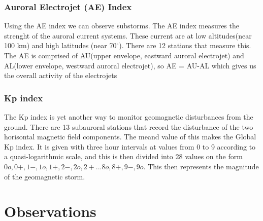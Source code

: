 \documentclass[norsk,a4paper,12pt]{article}
\begin{document}
\begin{multicols}{2}
\subsubsection{Auroral Electrojet (AE) Index} %
\label{sub:AE_index}
Using the AE index we can observe substorms. The AE index measures the strenght of the auroral current systems. These current are at low altitudes(near 100 km) and high latitudes (near 70$^\circ$). There are 12 stations that measure this. The AE is comprised of AU(upper envelope, eastward auroral electrojet) and AL(lower envelope, westward auroral electrojet), so AE = AU-AL which gives us the overall activity of the electrojets

\subsubsection{Kp index} %
\label{sub:Kp_index}
The Kp index is yet another way to monitor geomagnetic disturbances from the ground. There are 13 subauroral stations that record the disturbance of the two horisontal magnetic field components. The meand value of this makes the Global Kp index. It is given with three hour intervals at values from 0 to 9 according to a quasi-logarithmic scale, and this is then divided into 28 values on the form $0o,0+,1-,1o,1+,2-,2o,2+...8o,8+,9-,9o$. This then represents the magnitude of the geomagnetic storm.






\section{Observations} %
\label{sec:observations}


\end{multicols}
\end{document}
